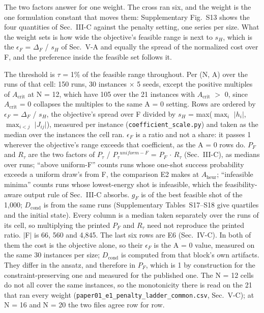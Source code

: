 \documentclass{ieeeaccess}
\begin{document}
The two factors answer for one weight. The cross ran six, and the weight is the one formulation constant that moves them: Supplementary Fig.~S13 shows the four quantities of Sec.~III-C against the penalty setting, one series per size. What the weight sets is how wide the objective's feasible range is next to $s_{H}$, which is the $\epsilon_{F}$ = $\Delta_{F}$ / $s_{H}$ of Sec.~V-A and equally the spread of the normalized cost over F, and the preference inside the feasible set follows it.


The threshold is $\tau$ = 1\% of the feasible range throughout. Per (N, A) over the runs of that cell: 150 runs, 30 instances $\times$ 5 seeds, except the positive multiples of $A_{\mathrm{crit}}$ at N = 12, which have 105 over the 21 instances with $A_{\mathrm{crit}}$ $>$ 0, since $A_{\mathrm{crit}}$ = 0 collapses the multiples to the same A = 0 setting. Rows are ordered by $\epsilon_{F}$ = $\Delta_{F}$ / $s_{H}$, the objective's spread over F divided by $s_{H}$ = max($\max_{i}$ $|$$h_{i}$$|$, $\max_{i<j}$ $|$$J_{ij}$$|$), measured per instance (\texttt{coefficient\_scale.py}) and taken as the median over the instances the cell ran. $\epsilon_{F}$ is a ratio and not a share: it passes 1 wherever the objective's range exceeds that coefficient, as the A = 0 rows do. $P_{F}$ and $R_{\tau}$ are the two factors of $P_{\tau}$ / $P_{\tau}$$^{uniform-F}$ = $P_{F}$ $\cdot$ $R_{\tau}$ (Sec.~III-C), as medians over runs; ``above uniform-F'' counts runs whose one-shot success probability exceeds a uniform draw's from F, the comparison E2 makes at $A_{\mathrm{heur}}$; ``infeasible minima'' counts runs whose lowest-energy shot is infeasible, which the feasibility-aware output rule of Sec.~III-C absorbs. $g_{F}$ is of the best feasible shot of the 1,000; $D_{\mathrm{cond}}$ is from the same runs (Supplementary Tables~S17--S18 give quartiles and the initial state). Every column is a median taken separately over the runs of its cell, so multiplying the printed $P_{F}$ and $R_{\tau}$ need not reproduce the printed ratio. $|$F$|$ is 66, 560 and 4,845. The last six rows are E6 (Sec.~IV-C). In both of them the cost is the objective alone, so their $\epsilon_{F}$ is the A = 0 value, measured on the same 30 instances per size; $D_{\mathrm{cond}}$ is computed from that block's own artifacts. They differ in the ansatz, and therefore in $P_{F}$, which is 1 by construction for the constraint-preserving one and measured for the published one. The N = 12 cells do not all cover the same instances, so the monotonicity there is read on the 21 that ran every weight (\texttt{paper01\_e1\_penalty\_ladder\_common.csv}, Sec.~V-C); at N = 16 and N = 20 the two files agree row for row.
\end{document}
